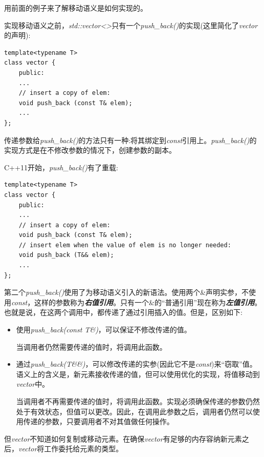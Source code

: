用前面的例子来了解移动语义是如何实现的。\par

实现移动语义之前，\textit{std::vector<>}只有一个\textit{push\_back()}的实现(这里简化了\textit{vector}的声明):\par

\begin{lstlisting}[caption={}]
template<typename T>
class vector {
	public:
	...
	// insert a copy of elem:
	void push_back (const T& elem);
	...
};
\end{lstlisting}

传递参数给\textit{push\_back()}的方法只有一种:将其绑定到\textit{const}引用上。\textit{push\_back()}的实现方式是在不修改参数的情况下，创建参数的副本。\par

C++11开始，\textit{push\_back()}有了重载:\par

\begin{lstlisting}[caption={}]
template<typename T>
class vector {
	public:
	...
	// insert a copy of elem:
	void push_back (const T& elem);
	// insert elem when the value of elem is no longer needed:
	void push_back (T&& elem);
	...
};
\end{lstlisting}

第二个\textit{push\_back()}使用了为移动语义引入的新语法。使用两个\&声明实参，不使用\textit{const}，这样的参数称为\textit{\textbf{右值引用}}。只有一个\&的“普通引用”现在称为\textit{\textbf{左值引用}}。也就是说，在这两个调用中，都传递了通过引用插入的值。但是，区别如下:\par

\begin{itemize}
	\item 使用\textit{push\_back(const T\&)}，可以保证不修改传递的值。\par
	当调用者仍然需要传递的值时，将调用此函数。
	\item 通过\textit{push\_back(T\&\&)}，可以修改传递的实参(因此它不是\textit{const})来“窃取”值。语义上的含义是，新元素接收传递的值，但可以使用优化的实现，将值移动到\textit{vector}中。\par
	当调用者不再需要传递的值时，将调用此函数。实现必须确保传递的参数仍然处于有效状态，但值可以更改。因此，在调用此参数之后，调用者仍然可以使用传递的参数，只要调用者不对其值做任何操作。
\end{itemize}

但\textit{vector}不知道如何复制或移动元素。在确保\textit{vector}有足够的内存容纳新元素之后，\textit{vector}将工作委托给元素的类型。\par

